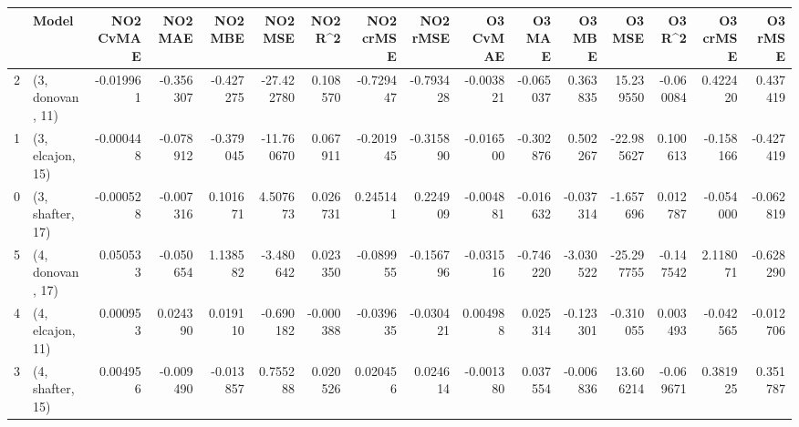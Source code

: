 \begin{tabular}{llrrrrrrrrrrrrrr}
\toprule
{} &             Model &  NO2 CvMAE &   NO2 MAE &   NO2 MBE &    NO2 MSE &   NO2 R\textasciicircum2 &  NO2 crMSE &  NO2 rMSE &  O3 CvMAE &    O3 MAE &    O3 MBE &     O3 MSE &    O3 R\textasciicircum2 &  O3 crMSE &   O3 rMSE \\
\midrule
2 &  (3, donovan, 11) &  -0.019961 & -0.356307 & -0.427275 & -27.422780 &  0.108570 &  -0.729447 & -0.793428 & -0.003821 & -0.065037 &  0.363835 &  15.239550 & -0.060084 &  0.422420 &  0.437419 \\
1 &  (3, elcajon, 15) &  -0.000448 & -0.078912 & -0.379045 & -11.760670 &  0.067911 &  -0.201945 & -0.315890 & -0.016500 & -0.302876 &  0.502267 & -22.985627 &  0.100613 & -0.158166 & -0.427419 \\
0 &  (3, shafter, 17) &  -0.000528 & -0.007316 &  0.101671 &   4.507673 &  0.026731 &   0.245141 &  0.224909 & -0.004881 & -0.016632 & -0.037314 &  -1.657696 &  0.012787 & -0.054000 & -0.062819 \\
5 &  (4, donovan, 17) &   0.050533 & -0.050654 &  1.138582 &  -3.480642 &  0.023350 &  -0.089955 & -0.156796 & -0.031516 & -0.746220 & -3.030522 & -25.297755 & -0.147542 &  2.118071 & -0.628290 \\
4 &  (4, elcajon, 11) &   0.000953 &  0.024390 &  0.019110 &  -0.690182 & -0.000388 &  -0.039635 & -0.030421 &  0.004988 &  0.025314 & -0.123301 &  -0.310055 &  0.003493 & -0.042565 & -0.012706 \\
3 &  (4, shafter, 15) &   0.004956 & -0.009490 & -0.013857 &   0.755288 &  0.020526 &   0.020456 &  0.024614 & -0.001380 &  0.037554 & -0.006836 &  13.606214 & -0.069671 &  0.381925 &  0.351787 \\
\bottomrule
\end{tabular}
